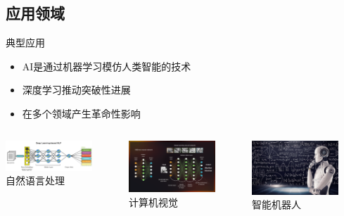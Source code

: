 \subsection{应用领域}
\begin{frame}{典型应用}
  \begin{itemize}
	  \item \textrm{AI}是通过机器学习模仿人类智能的技术
    \item 深度学习推动突破性进展
    \item 在多个领域产生革命性影响
  \end{itemize}

  \begin{columns}
    \centering
    \includegraphics[width=0.8\textwidth]{Figures/AI_Deeplearning-NLP.png}\\
    自然语言处理

    \centering
    \includegraphics[width=0.8\textwidth]{Figures/AI_Deeplearning-CV.png}\\
    计算机视觉

    \centering
    \includegraphics[width=0.8\textwidth]{Figures/AI_Robot-AI-machine-learning-hero.jpg}\\
    智能机器人
  \end{columns}


\end{frame}
